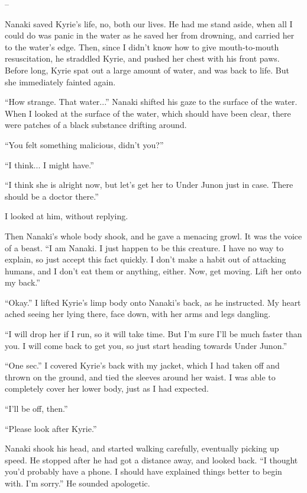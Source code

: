 \documentclass[oneside]{book}
\begin{document}
–

Nanaki saved Kyrie’s life, no, both our lives. He had me stand aside, when all I could do was panic in the water as he saved her from drowning, and carried her to the water’s edge. Then, since I didn’t know how to give mouth-to-mouth resuscitation, he straddled Kyrie, and pushed her chest with his front paws. Before long, Kyrie spat out a large amount of water, and was back to life. But she immediately fainted again.

“How strange. That water...” Nanaki shifted his gaze to the surface of the water. When I looked at the surface of the water, which should have been clear, there were patches of a black substance drifting around.

“You felt something malicious, didn’t you?”

“I think... I might have.”

“I think she is alright now, but let’s get her to Under Junon just in case. There should be a doctor there.”

I looked at him, without replying.

Then Nanaki’s whole body shook, and he gave a menacing growl. It was the voice of a beast. “I am Nanaki. I just happen to be this creature. I have no way to explain, so just accept this fact quickly. I don’t make a habit out of attacking humans, and I don’t eat them or anything, either. Now, get moving. Lift her onto my back.”

“Okay.” I lifted Kyrie’s limp body onto Nanaki’s back, as he instructed. My heart ached seeing her lying there, face down, with her arms and legs dangling.

“I will drop her if I run, so it will take time. But I’m sure I’ll be much faster than you. I will come back to get you, so just start heading towards Under Junon.”

“One sec.” I covered Kyrie’s back with my jacket, which I had taken off and thrown on the ground, and tied the sleeves around her waist. I was able to completely cover her lower body, just as I had expected.

“I’ll be off, then.”

“Please look after Kyrie.”

Nanaki shook his head, and started walking carefully, eventually picking up speed. He stopped after he had got a distance away, and looked back. “I thought you’d probably have a phone. I should have explained things better to begin with. I’m sorry.” He sounded apologetic.
\end{document}
